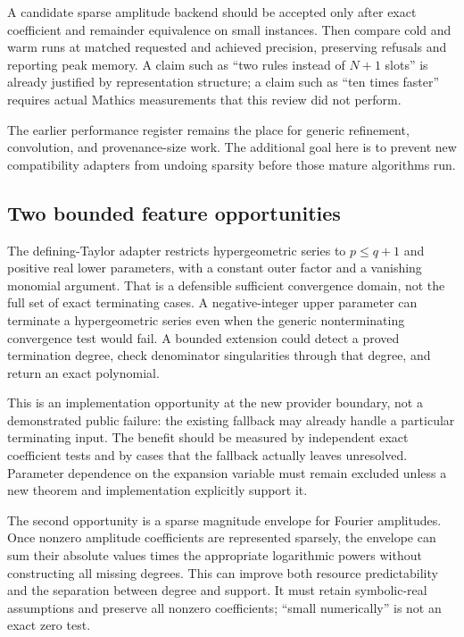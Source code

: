 \documentclass[11pt,a4paper]{article}
\begin{document}
A candidate sparse amplitude backend should be accepted only after exact coefficient and remainder equivalence on small instances. Then compare cold and warm runs at matched requested and achieved precision, preserving refusals and reporting peak memory. A claim such as ``two rules instead of $N+1$ slots'' is already justified by representation structure; a claim such as ``ten times faster'' requires actual Mathics measurements that this review did not perform.

The earlier performance register remains the place for generic refinement, convolution, and provenance-size work. The additional goal here is to prevent new compatibility adapters from undoing sparsity before those mature algorithms run.

\subsection{Two bounded feature opportunities}
The defining-Taylor adapter restricts hypergeometric series to $p\le q+1$ and positive real lower parameters, with a constant outer factor and a vanishing monomial argument. That is a defensible sufficient convergence domain, not the full set of exact terminating cases. A negative-integer upper parameter can terminate a hypergeometric series even when the generic nonterminating convergence test would fail. A bounded extension could detect a proved termination degree, check denominator singularities through that degree, and return an exact polynomial.\cite{taylorshim}

This is an implementation opportunity at the new provider boundary, not a demonstrated public failure: the existing fallback may already handle a particular terminating input. The benefit should be measured by independent exact coefficient tests and by cases that the fallback actually leaves unresolved. Parameter dependence on the expansion variable must remain excluded unless a new theorem and implementation explicitly support it.

The second opportunity is a sparse magnitude envelope for Fourier amplitudes. Once nonzero amplitude coefficients are represented sparsely, the envelope can sum their absolute values times the appropriate logarithmic powers without constructing all missing degrees. This can improve both resource predictability and the separation between degree and support. It must retain symbolic-real assumptions and preserve all nonzero coefficients; ``small numerically'' is not an exact zero test.
\end{document}
